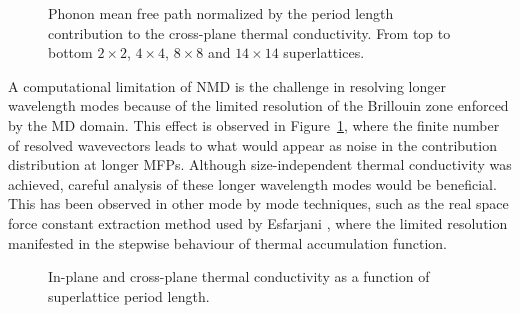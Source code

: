 \documentclass[aps,prb,preprint,preprintnumbers,amsmath,amssymb,floatfix,superscriptaddress]{revtex4}
\begin{document}
\begin{figure}%
\begin{center}
\renewcommand{\figure}{Fig.}
\caption{Phonon mean free path normalized by the period length contribution to the cross-plane thermal conductivity. From top to bottom $2\times2$, $4\times4$, $8\times8$ and $14\times14$ superlattices.}
\label{FIG:MFP_cp}
\end{center}
\end{figure}

A computational limitation of NMD is the challenge in resolving longer wavelength modes because of the limited resolution of the Brillouin zone enforced by the MD domain. This effect is observed in Figure~\ref{FIG:MFP_cp}, where the finite number of resolved wavevectors leads to what would appear as noise in the contribution distribution at longer MFPs. Although size-independent thermal conductivity was achieved, careful analysis of these longer wavelength modes would be beneficial. This has been observed in other mode by mode techniques, such as the real space force constant extraction method used by Esfarjani \cite{PhysRevB.84.085204}, where the limited resolution manifested in the stepwise behaviour of thermal accumulation function.

\begin{figure}%
\begin{center}
\renewcommand{\figure}{Fig.}
\caption{In-plane and cross-plane thermal conductivity as a function of superlattice period length.}
\label{FIG:NMD_v_GK}
\end{center}
\end{figure}
\end{document}
